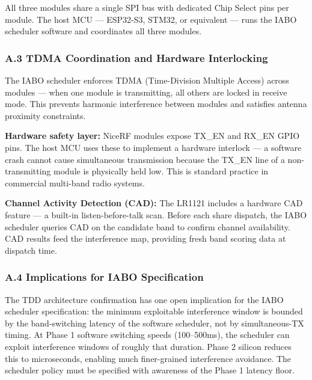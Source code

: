 \documentclass[
  11pt,
]{article}
\begin{document}
All three modules share a single SPI bus with dedicated Chip Select pins
per module. The host MCU --- ESP32-S3, STM32, or equivalent --- runs the
IABO scheduler software and coordinates all three modules.

\hypertarget{a.3-tdma-coordination-and-hardware-interlocking}{%
\subsubsection{A.3 TDMA Coordination and Hardware
Interlocking}\label{a.3-tdma-coordination-and-hardware-interlocking}}

The IABO scheduler enforces TDMA (Time-Division Multiple Access) across
modules --- when one module is transmitting, all others are locked in
receive mode. This prevents harmonic interference between modules and
satisfies antenna proximity constraints.

\textbf{Hardware safety layer:} NiceRF modules expose TX\_EN and RX\_EN
GPIO pins. The host MCU uses these to implement a hardware interlock ---
a software crash cannot cause simultaneous transmission because the
TX\_EN line of a non-transmitting module is physically held low. This is
standard practice in commercial multi-band radio systems.

\textbf{Channel Activity Detection (CAD):} The LR1121 includes a
hardware CAD feature --- a built-in listen-before-talk scan. Before each
share dispatch, the IABO scheduler queries CAD on the candidate band to
confirm channel availability. CAD results feed the interference map,
providing fresh band scoring data at dispatch time.

\hypertarget{a.4-implications-for-iabo-specification}{%
\subsubsection{A.4 Implications for IABO
Specification}\label{a.4-implications-for-iabo-specification}}

The TDD architecture confirmation has one open implication for the IABO
scheduler specification: the minimum exploitable interference window is
bounded by the band-switching latency of the software scheduler, not by
simultaneous-TX timing. At Phase 1 software switching speeds
(100--500ms), the scheduler can exploit interference windows of roughly
that duration. Phase 2 silicon reduces this to microseconds, enabling
much finer-grained interference avoidance. The scheduler policy must be
specified with awareness of the Phase 1 latency floor.
\end{document}

